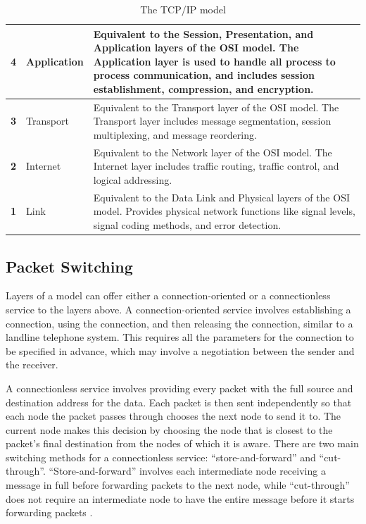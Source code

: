 \begin{table}[t]
  \caption{The TCP/IP model \cite{tcpip_pearson}}
  \begin{center}
    \begin{tabularx}{\textwidth}{|c|l|X|}
      \hline
      \textbf{4} & Application & Equivalent to the Session, Presentation, and Application layers of the OSI model. The Application layer is used to handle all process to process communication, and includes session establishment, compression, and encryption. \\ \hline
      \textbf{3} & Transport & Equivalent to the Transport layer of the OSI model. The Transport layer includes message segmentation, session multiplexing, and message reordering. \\ \hline
      \textbf{2} & Internet & Equivalent to the Network layer of the OSI model. The Internet layer includes traffic routing, traffic control, and logical addressing. \\ \hline
      \textbf{1} & Link & Equivalent to the Data Link and Physical layers of the OSI model. Provides physical network functions like signal levels, signal coding methods, and error detection. \\ \hline
    \end{tabularx}
  \end{center}
  \label{tcp_ip_model}
\end{table}

\subsection{Packet Switching}
Layers of a model can offer either a connection-oriented or a connectionless service to the layers above. A connection-oriented service involves establishing a connection, using the connection, and then releasing the connection, similar to a landline telephone system. This requires all the parameters for the connection to be specified in advance, which may involve a negotiation between the sender and the receiver.

A connectionless service involves providing every packet with the full source and destination address for the data. Each packet is then sent independently so that each node the packet passes through chooses the next node to send it to. The current node makes this decision by choosing the node that is closest to the packet's final destination from the nodes of which it is aware. There are two main switching methods for a connectionless service: ``store-and-forward'' and ``cut-through''. ``Store-and-forward'' involves each intermediate node receiving a message in full before forwarding packets to the next node, while ``cut-through'' does not require an intermediate node to have the entire message before it starts forwarding packets \cite{tanenbaum}.

